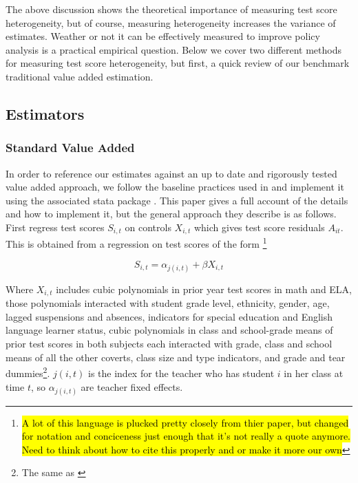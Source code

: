 \documentclass[12pt]{article}
\theoremstyle{definition}
\theoremstyle{definition}
\theoremstyle{definition}
\theoremstyle{definition}
\begin{document}
    The above discussion shows the theoretical importance of measuring test score heterogeneity, but of course, measuring heterogeneity increases the variance of estimates. Weather or not it can be effectively measured to improve policy analysis is a practical empirical question. Below we cover two different methods for measuring test score heterogeneity, but first, a quick review of our benchmark traditional value added estimation. 


    \subsection{Estimators}
    \subsubsection{Standard Value Added}

    In order to reference our estimates against an up to date and rigorously tested value added approach, we follow the baseline practices used in \citet{chetty2014measuring1} and implement it using the associated stata package \citep{vam_stata_ado}. This paper gives a full account of the details and how to implement it, but the general approach they describe is as follows. First regress test scores $S_{i,t}$ on controls $X_{i, t}$ which gives test score residuals $A_{it}$. This is obtained from a regression on test scores of the form \footnote{\hl{A lot of this language is plucked pretty closely from thier paper, but changed for notation and conciceness just enough that it's not really a quote anymore. Need to think about how to cite this properly and or make it more our own}}

    \begin{equation}
        S_{i,t} = \alpha_{j(i, t)} + \beta X_{i, t}
    \end{equation}

    Where $X_{i, t}$ includes cubic polynomials in prior year test scores in math and ELA, those polynomials interacted with student grade level, ethnicity, gender, age, lagged suspensions and absences, indicators for special education and English language learner status, cubic polynomials in class and school-grade means of prior test scores in both subjects each interacted with grade, class and school means of all the other coverts, class size and type indicators, and grade and tear dummies\footnote{The same as \citep{chetty2014measuring1}}. $j(i, t)$ is the index for the teacher who has student $i$ in her class at time $t$, so $\alpha_{j(i, t)}$ are teacher fixed effects.
\end{document}
